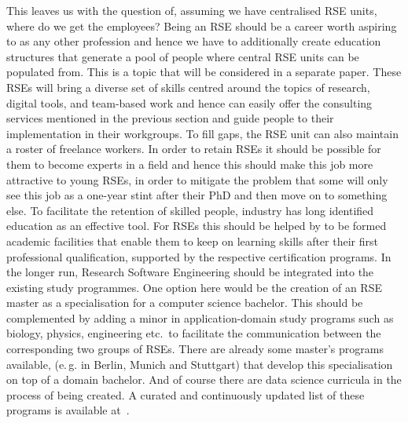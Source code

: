\documentclass[a4paper]{article}
\makeatletter
\newcommand*{\eg}{e.\,g.\@\xspace}
\makeatother
\begin{document}
This leaves us with the question of, assuming we have centralised RSE units, where do we get the employees?
Being an RSE should be a career worth aspiring to as any other profession and hence we have to additionally create education structures that generate a pool of people where central RSE units can be populated from.
This is a topic that will be considered in a separate paper.
These RSEs will bring a diverse set of skills centred around the topics of research,
digital tools, and team-based work and hence can easily offer the consulting services mentioned in the previous section and guide people to their implementation in their workgroups.
To fill gaps, the RSE unit can also maintain a roster of freelance workers.
In order to retain RSEs it should be possible for them to become experts in a field and hence this should make this job more attractive to young RSEs,
in order to mitigate the problem that some will only see this job as a one-year stint after their PhD and then move on to something else.
To facilitate the retention of skilled people, industry has long identified education as an effective tool.
For RSEs this should be helped by to be formed academic facilities that enable them to keep on learning skills after their first professional qualification, supported by the respective certification programs.
In the longer run, Research Software Engineering should be integrated into the existing study programmes.
One option here would be the creation of an RSE master as a specialisation for a computer science bachelor.
This should be complemented by adding a minor in application-domain study programs such as biology, physics, engineering etc.\ to facilitate the communication between the corresponding two groups of RSEs.
There are already some master's programs available, (\eg{} in Berlin, Munich and Stuttgart) that develop this specialisation on top of a domain bachelor.
And of course there are data science curricula in the process of being created.
A curated and continuously updated list of these programs is available at~\cite{learnandteachlearn}.


\printbibliography[heading=bibintoc]
\end{document}
